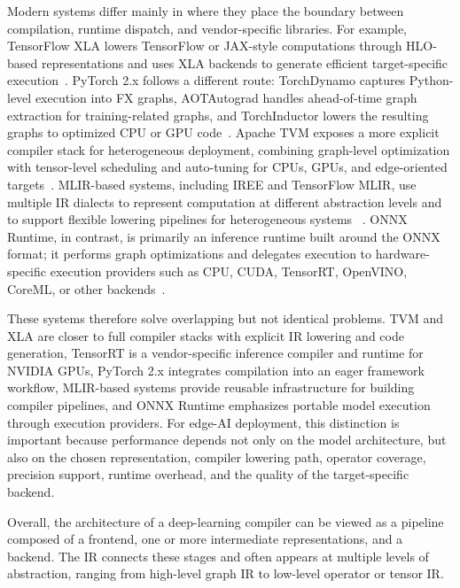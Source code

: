 \documentclass[12pt,a4paper]{report}
\begin{document}
Modern systems differ mainly in where they place the boundary between compilation, runtime
dispatch, and vendor-specific libraries. For example, TensorFlow XLA lowers TensorFlow or JAX-style
computations through HLO-based representations and uses XLA backends to generate efficient
target-specific execution~\cite{tensorflow_xla_architecture,xla_hlo_tooling}. PyTorch 2.x follows a
different route: TorchDynamo captures Python-level execution into FX graphs, AOTAutograd handles
ahead-of-time graph extraction for training-related graphs, and TorchInductor lowers the resulting
graphs to optimized CPU or GPU code~\cite{pytorch_torch_compile,pytorch_compile_faq,pytorch_2x}.
Apache TVM exposes a more explicit compiler stack for heterogeneous deployment, combining
graph-level optimization with tensor-level scheduling and auto-tuning for CPUs, GPUs, and
edge-oriented targets~\cite{apache_tvm_home, chen2018tvm}. MLIR-based systems, including IREE
and TensorFlow MLIR, use multiple IR dialects to represent computation at different abstraction
levels and to support flexible lowering pipelines for heterogeneous systems
~\cite{lattner2021mlir,mlir_overview,tensorflow_mlir_overview,iree_home}. ONNX Runtime, in
contrast, is primarily an inference runtime built around the ONNX format; it performs graph
optimizations and delegates execution to hardware-specific execution providers such as CPU, CUDA,
TensorRT, OpenVINO, CoreML, or other backends~\cite{onnxruntime_home,onnxruntime_execution_providers}.

These systems therefore solve overlapping but not identical problems. TVM and XLA are closer to
full compiler stacks with explicit IR lowering and code generation, TensorRT is a vendor-specific
inference compiler and runtime for NVIDIA GPUs, PyTorch 2.x integrates compilation into an eager
framework workflow, MLIR-based systems provide reusable infrastructure for building compiler
pipelines, and ONNX Runtime emphasizes portable model execution through execution providers.
For edge-AI deployment, this distinction is important because performance depends not only on the
model architecture, but also on the chosen representation, compiler lowering path, operator coverage,
precision support, runtime overhead, and the quality of the target-specific backend.

Overall, the architecture of a deep-learning compiler can be viewed as a pipeline composed of a
frontend, one or more intermediate representations, and a backend. The IR connects these stages and often appears
at multiple levels of abstraction, ranging from high-level graph IR to low-level operator or tensor IR.
\end{document}
